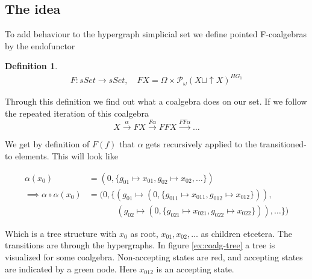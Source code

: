 \documentclass[12pt]{article}
\theoremstyle{definition}
\newtheorem{definition}[theorem]{Definition}
\newcommand{\1}{\mathbbm{1}}
\newcommand{\finP}{\mathcal{P}_{\omega}}
\begin{document}
\subsection{The idea}
To add behaviour to the hypergraph simplicial set we define pointed F-coalgebras by the endofunctor

\begin{definition}
    \begin{align*}
        F: sSet \to sSet, \quad FX = \Omega \times \finP(X \sqcup \uparrow X)^{HG_1}
    \end{align*}
\end{definition}

Through this definition we find out what a coalgebra does on our set. If we follow the repeated iteration of this coalgebra
\[
    X\xrightarrow{\alpha} FX \xrightarrow{F\alpha} FFX \xrightarrow{FF\alpha} \dots
\]

We get by definition of $F(f)$ that $\alpha$ gets recursively applied to the transitioned-to elements. This will look like

\begin{align*}
    \alpha(x_0) &= (0, \{g_{01}\mapsto x_{01}, g_{02}\mapsto x_{02}, \dots\})\\
    \implies \alpha\circ\alpha(x_0) &= (0, \{(g_{01}\mapsto (0, \{g_{011}\mapsto x_{011}, g_{012}\mapsto x_{012}\})),\\
    &\hspace{40pt}(g_{02}\mapsto (0, \{g_{021}\mapsto x_{021}, g_{022}\mapsto x_{022}\})), \dots\})
\end{align*}

Which is a tree structure with $x_0$ as root, $x_{01}, x_{02}, \dots$ as children etcetera. The transitions are through the hypergraphs.  In figure \ref{ex:coalg-tree} a tree is visualized for some coalgebra. Non-accepting states are red, and accepting states are indicated by a green node. Here $x_{012}$ is an accepting state.
\end{document}
